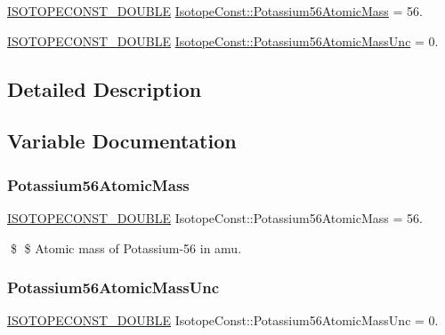 \begin{DoxyCompactItemize}
\item 
\mbox{\hyperlink{group___isotope_const-_macros_ga8f45a7272ce02c0b4c65c44636ed719a}{I\+S\+O\+T\+O\+P\+E\+C\+O\+N\+S\+T\+\_\+\+D\+O\+U\+B\+LE}} \mbox{\hyperlink{group___isotope_const-_potassium-_k56_ga234adf1825d9989e882396743d4d7ca0}{Isotope\+Const\+::\+Potassium56\+Atomic\+Mass}} = 56.
\item 
\mbox{\hyperlink{group___isotope_const-_macros_ga8f45a7272ce02c0b4c65c44636ed719a}{I\+S\+O\+T\+O\+P\+E\+C\+O\+N\+S\+T\+\_\+\+D\+O\+U\+B\+LE}} \mbox{\hyperlink{group___isotope_const-_potassium-_k56_ga563aa0ab1fe093a6c25f9ad5635ee50c}{Isotope\+Const\+::\+Potassium56\+Atomic\+Mass\+Unc}} = 0.
\end{DoxyCompactItemize}


\subsection{Detailed Description}


\subsection{Variable Documentation}
\mbox{\label{group___isotope_const-_potassium-_k56_ga234adf1825d9989e882396743d4d7ca0}} 
\subsubsection{\texorpdfstring{Potassium56\+Atomic\+Mass}{Potassium56AtomicMass}}
{\footnotesize\ttfamily \mbox{\hyperlink{group___isotope_const-_macros_ga8f45a7272ce02c0b4c65c44636ed719a}{I\+S\+O\+T\+O\+P\+E\+C\+O\+N\+S\+T\+\_\+\+D\+O\+U\+B\+LE}} Isotope\+Const\+::\+Potassium56\+Atomic\+Mass = 56.}

\$ \$ Atomic mass of Potassium-\/56 in amu. \mbox{\label{group___isotope_const-_potassium-_k56_ga563aa0ab1fe093a6c25f9ad5635ee50c}} 
\subsubsection{\texorpdfstring{Potassium56\+Atomic\+Mass\+Unc}{Potassium56AtomicMassUnc}}
{\footnotesize\ttfamily \mbox{\hyperlink{group___isotope_const-_macros_ga8f45a7272ce02c0b4c65c44636ed719a}{I\+S\+O\+T\+O\+P\+E\+C\+O\+N\+S\+T\+\_\+\+D\+O\+U\+B\+LE}} Isotope\+Const\+::\+Potassium56\+Atomic\+Mass\+Unc = 0.}

